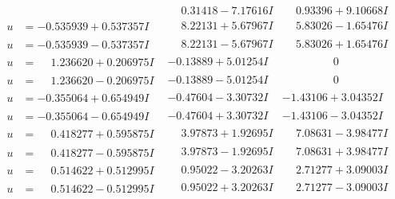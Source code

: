 \documentclass[1p]{elsarticle_modified}
\theoremstyle{definition}
\begin{document}
$$\begin{array}{c|c|c}
 & \phantom{-}0.31418 - 7.17616 I & \phantom{-}0.93396 + 9.10668 I \\ \hline\begin{aligned}
u &= -0.535939 + 0.537357 I\end{aligned}
 & \phantom{-}8.22131 + 5.67967 I & \phantom{-}5.83026 - 1.65476 I \\ \hline\begin{aligned}
u &= -0.535939 - 0.537357 I\end{aligned}
 & \phantom{-}8.22131 - 5.67967 I & \phantom{-}5.83026 + 1.65476 I \\ \hline\begin{aligned}
u &= \phantom{-}1.236620 + 0.206975 I\end{aligned}
 & -0.13889 + 5.01254 I & \phantom{-0.000000 } 0 \\ \hline\begin{aligned}
u &= \phantom{-}1.236620 - 0.206975 I\end{aligned}
 & -0.13889 - 5.01254 I & \phantom{-0.000000 } 0 \\ \hline\begin{aligned}
u &= -0.355064 + 0.654949 I\end{aligned}
 & -0.47604 - 3.30732 I & -1.43106 + 3.04352 I \\ \hline\begin{aligned}
u &= -0.355064 - 0.654949 I\end{aligned}
 & -0.47604 + 3.30732 I & -1.43106 - 3.04352 I \\ \hline\begin{aligned}
u &= \phantom{-}0.418277 + 0.595875 I\end{aligned}
 & \phantom{-}3.97873 + 1.92695 I & \phantom{-}7.08631 - 3.98477 I \\ \hline\begin{aligned}
u &= \phantom{-}0.418277 - 0.595875 I\end{aligned}
 & \phantom{-}3.97873 - 1.92695 I & \phantom{-}7.08631 + 3.98477 I \\ \hline\begin{aligned}
u &= \phantom{-}0.514622 + 0.512995 I\end{aligned}
 & \phantom{-}0.95022 - 3.20263 I & \phantom{-}2.71277 + 3.09003 I \\ \hline\begin{aligned}
u &= \phantom{-}0.514622 - 0.512995 I\end{aligned}
 & \phantom{-}0.95022 + 3.20263 I & \phantom{-}2.71277 - 3.09003 I \\ \hline\begin{aligned}

\end{aligned}
\end{array}$$
\end{document}
